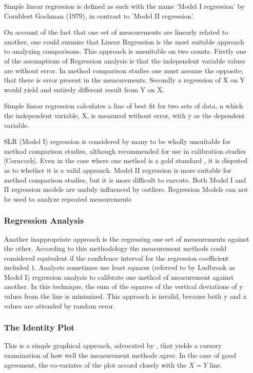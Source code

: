 \documentclass[12pt, a4paper]{report}
\theoremstyle{plain}
\theoremstyle{definition}
\theoremstyle{remark}
\begin{document}

Simple linear regression is defined as such with the name `Model I regression' by Cornbleet Gochman (1979), in contrast to 'Model II regression'.

On account of the fact that one set of measurements are linearly related to another, one could surmise that Linear Regression is the most suitable approach to analyzing comparisons. This approach is unsuitable on two counts. Firstly one of the assumptions of Regression analysis is that the independent variable values are without error. In method comparison studies one must assume the opposite; that there is error present in the measurements. Secondly a regression of X on Y would yield and entirely different result from Y on X.


Simple linear regression calculates a line of best fit for two
sets of data, n which the independent variable, X, is measured without error, with y as the dependent variable.  

SLR (Model I) regression is considered by many \citet{BA83,CornCoch,ludbrook97} to be wholly unsuitable for
method comparison studies, although recommended for use in calibration studies [Corncoch]. Even in the case where one
method is a gold standard , it is disputed as to whether it is a valid approach. Model II regression is more suitable for method comparison studies, but it is more difficult to execute. Both Model I and II regression models are unduly influenced by outliers. Regression Models can not be used to analyze repeated measurements

\subsubsection{Regression Analysis}
Another inappropriate approach is the regressing one set of measurements against the other. According to this methodology the measurement methods could considered equivalent if the confidence interval for
the regression coefficient included $1$. Analysts sometimes use least squares (referred to by Ludbrook as Model I) regression analysis to calibrate one method of measurement against another. In this technique, the sum of the squares of the vertical deviations of y values from the line is minimized. This approach is invalid, because both y and x values are attended by random error.


\subsubsection{The Identity Plot} This is a simple graphical approach, advocated by \citet{BA86}, that yields a cursory examination of how well the measurement methods agree. In the case of good agreement, the co-variates of the plot accord closely with the $X=Y$ line.
\end{document}
